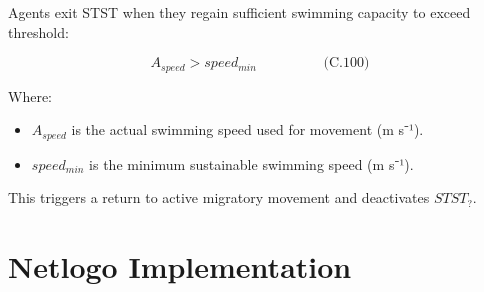 \documentclass[
]{book}
\providecommand{\tightlist}{%
  \setlength{\itemsep}{0pt}\setlength{\parskip}{0pt}}
\begin{document}
Agents exit STST when they regain sufficient swimming capacity to exceed
threshold:

\[
\begin{equation} A_{speed} > speed_{min}  \hspace{2cm} \text{(C.100)} \end{equation}
\]

Where:

\begin{itemize}
\tightlist
\item
  \(A_{speed}\) is the actual swimming speed used for movement (m s⁻¹).
\item
  \(speed_{min}\) is the minimum sustainable swimming speed (m s⁻¹).
\end{itemize}

This triggers a return to active migratory movement and deactivates
\(STST_{?}\).

\section{Netlogo Implementation}\label{netlogo-implementation-10}
\end{document}
